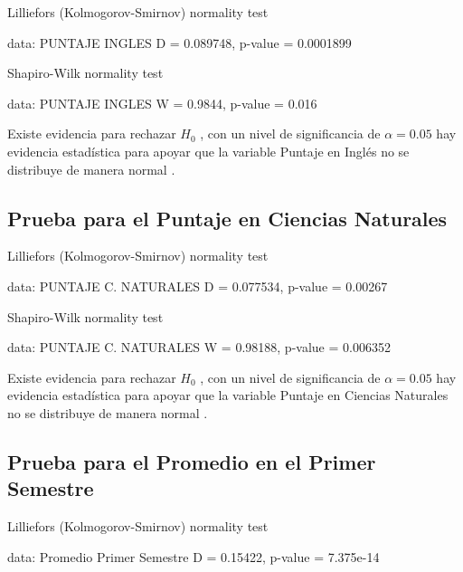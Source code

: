 \documentclass[
  man]{apa6}
\begin{document}
\begin{center}

    Lilliefors (Kolmogorov-Smirnov) normality test

data:  PUNTAJE INGLES
D = 0.089748, p-value = 0.0001899


    Shapiro-Wilk normality test

data:  PUNTAJE INGLES
W = 0.9844, p-value = 0.016
\end{center}

Existe evidencia para rechazar \(H_0\) , con un nivel de significancia de
\(\alpha=0.05\) hay evidencia estadística para apoyar que la variable
Puntaje en Inglés no se distribuye de manera normal .

\hypertarget{prueba-para-el-puntaje-en-ciencias-naturales}{%
\subsection{Prueba para el Puntaje en Ciencias Naturales}\label{prueba-para-el-puntaje-en-ciencias-naturales}}

\begin{center}

    Lilliefors (Kolmogorov-Smirnov) normality test

data:  PUNTAJE C. NATURALES
D = 0.077534, p-value = 0.00267


    Shapiro-Wilk normality test

data:  PUNTAJE C. NATURALES
W = 0.98188, p-value = 0.006352
\end{center}

Existe evidencia para rechazar \(H_0\) , con un nivel de significancia de
\(\alpha=0.05\) hay evidencia estadística para apoyar que la variable
Puntaje en Ciencias Naturales no se distribuye de manera normal .

\hypertarget{prueba-para-el-promedio-en-el-primer-semestre}{%
\subsection{Prueba para el Promedio en el Primer Semestre}\label{prueba-para-el-promedio-en-el-primer-semestre}}

\begin{center}


    Lilliefors (Kolmogorov-Smirnov) normality test

data:  Promedio Primer Semestre
D = 0.15422, p-value = 7.375e-14
\end{center}
\end{document}
